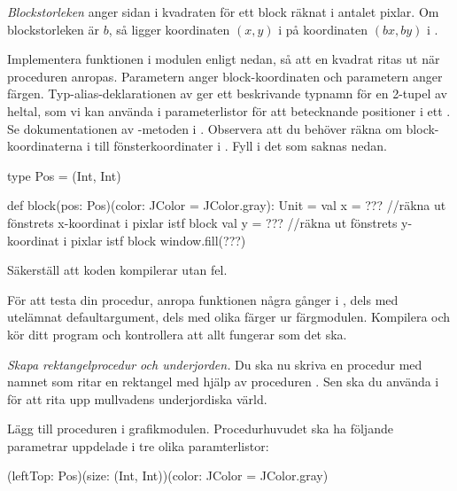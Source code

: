 \begin{framed}
\noindent \emph{Blockstorleken} anger sidan i kvadraten för ett block räknat i antalet pixlar. Om blockstorleken är $b$, så ligger koordinaten $(x, y)$ i  på koordinaten $(bx, by)$ i .

\end{framed}

\noindent Implementera funktionen  i modulen  enligt nedan, så att en kvadrat ritas ut när proceduren anropas. Parametern  anger block-koordinaten och parametern  anger färgen. Typ-alias-deklarationen av  ger ett beskrivande typnamn för en 2-tupel av heltal, som vi kan använda i parameterlistor för att betecknande positioner i ett . Se dokumentationen av -metoden i . Observera att du behöver räkna om block-koordinaterna i  till fönsterkoordinater i . Fyll i det som saknas nedan.
\begin{Code}
  type Pos = (Int, Int)

  def block(pos: Pos)(color: JColor = JColor.gray): Unit = {
    val x = ??? //räkna ut fönstrets x-koordinat i pixlar istf block
    val y = ??? //räkna ut fönstrets y-koordinat i pixlar istf block
    window.fill(???)
  }
\end{Code}
Säkerställ att koden kompilerar utan fel.


\Subtask
För att testa din procedur, anropa funktionen  några gånger i , dels med utelämnat defaultargument, dels med olika färger ur färgmodulen. Kompilera och kör ditt program och kontrollera att allt fungerar som det ska.



\Task \emph{Skapa rektangelprocedur och underjorden.} Du ska nu skriva en procedur med namnet  som ritar en rektangel med hjälp av proceduren . Sen ska du använda  i  för att rita upp mullvadens underjordiska värld.

\Subtask
Lägg till proceduren  i grafikmodulen. Procedurhuvudet ska ha följande parametrar uppdelade i tre olika paramterlistor:
\begin{Code}
(leftTop: Pos)(size: (Int, Int))(color: JColor = JColor.gray)
\end{Code}

